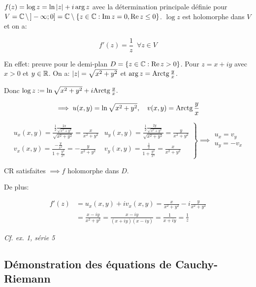 \begin{example}[4]\hfill
    
    $f(z) = \log z = \ln \left|z\right| + i \arg z$ avec la détermination principale définie pour $V = \mathbb{C}\, \setminus\, ]-\infty; 0] = \mathbb{C} \setminus \{z \in \mathbb{C} : \operatorname{Im} z = 0, \operatorname{Re} z \leq 0\}$.
    $\log z$ est holomorphe dans $V$ et on a:
    
    \[f'(z) = \frac{1}{z} \enspace \forall z \in V\]
    
    En effet: preuve pour le demi-plan $D = \{z \in \mathbb{C} : \operatorname{Re} z > 0\}$.
    Pour $z = x +iy$ avec $x > 0$ et $y \in \mathbb{R}$.
    On a: $\left|z\right| = \sqrt{x^2 + y^2}$ et $\arg z = \textrm{Arctg}\, \frac{y}{x}$.
    
    Donc $\log z := \ln \sqrt{x^2 + y^2} + i \textrm{Arctg}\, \frac{y}{x}.$
    
    \[\implies u(x,y) = \ln \sqrt{x^2 + y^2}, \quad v(x,y) = \textrm{Arctg}\, \frac{y}{x}\]
    
    \[\left.
    \begin{array}{ll}
    u_x(x,y) = \frac{\frac{1}{2}\frac{2x}{\sqrt{x^2 + y^2}}}{\sqrt{x^2 + y^2}}
    = \frac{x}{x^2 + y^2} &
    u_y(x,y) = \frac{\frac{1}{2}\frac{2y}{\sqrt{x^2 + y^2}}}{\sqrt{x^2 + y^2}}
    = \frac{y}{x^2 + y^2} \\
    v_x(x,y) = \frac{-\frac{y}{x^2}}{1 + \frac{y^2}{x^2}}
    = - \frac{y}{x^2 + y^2} &
    v_y(x,y) = \frac{\frac{1}{x}}{1 + \frac{y^2}{x^2}}
    =  \frac{x}{x^2 + y^2}
    \end{array}
    \right\} \implies
    \begin{array}{l}
    u_x = v_y \\
    u_y = -v_x
    \end{array}\]
    
    CR satisfaites $\implies f$ holomorphe dans $D$.
    
    De plus:
    
    \begin{align*}
    f'(z) &= u_x(x,y) + i v_x(x,y) = \frac{x}{x^2 + y^2} - i \frac{y}{x^2 + y^2}
    \\&=
    \frac{x - iy}{x^2 + y^2} = \frac{x - iy}{(x + iy)(x - iy)} = \frac{1}{x + iy} = \frac{1}{z}
    \end{align*}
\end{example}

\textit{Cf. ex. 1, série 5}

\subsection{Démonstration des équations de Cauchy-Riemann}

